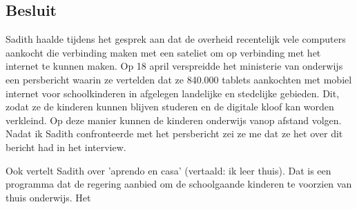 \subsection{Besluit}

Sadith haalde tijdens het gesprek aan dat de overheid recentelijk vele computers aankocht die verbinding maken met een sateliet om op verbinding met het internet te kunnen maken. Op 18 april verspreidde het ministerie van onderwijs een persbericht waarin ze vertelden dat ze 840.000 tablets aankochten met mobiel internet voor schoolkinderen in afgelegen landelijke en stedelijke gebieden. Dit, zodat ze de kinderen kunnen blijven studeren en de digitale kloof kan worden verkleind. Op deze manier kunnen de kinderen onderwijs vanop afstand volgen.\autocite{Minedu2020} Nadat ik Sadith confronteerde met het persbericht zei ze me dat ze het over dit bericht had in het interview. 

Ook vertelt Sadith over 'aprendo en casa' (vertaald: ik leer thuis). Dat is een programma dat de regering aanbied om de schoolgaande kinderen te voorzien van thuis onderwijs. Het \autocite{Minedu2020a}
